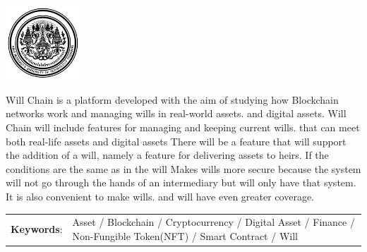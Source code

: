 \documentclass[12pt,oneside,openright,a4paper]{cpe-thai-project}
\begin{document}
\pdfstringdefDisableCommands{%
\let\MakeUppercase\relax
}

\begin{center}
  \includegraphics[width=2.8cm]{logo02.jpg}
\end{center}
\vspace*{-1cm}

\maketitlepage
\makesignaturepage 

\abstract

Will Chain is a platform developed with the aim of studying how Blockchain networks work and managing wills in real-world assets. and digital assets. Will Chain will include features for managing and keeping current wills. that can meet both real-life assets and digital assets There will be a feature that will support the addition of a will, namely a feature for delivering assets to heirs. If the conditions are the same as in the will Makes wills more secure because the system will not go through the hands of an intermediary but will only have that system. It is also convenient to make wills. and will have even greater coverage.

\begin{flushleft}
\begin{tabular*}{\textwidth}{@{}lp{}}
\textbf{Keywords}: & Asset / Blockchain / Cryptocurrency / Digital Asset / Finance / Non-Fungible Token(NFT) /  Smart Contract / Will 
\end{tabular*}
\end{flushleft}
\endabstract

\newcommand\tab[1][1cm]{\hspace*{#1}}
\thaiabstract
\end{document}
